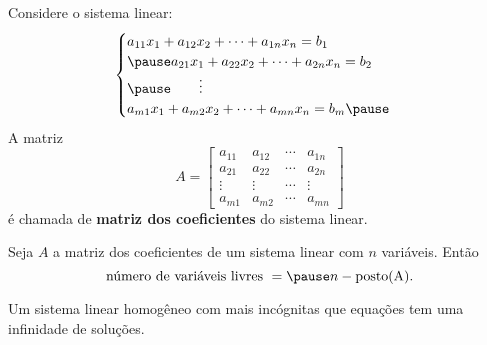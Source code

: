 \documentclass{beamer}
\begin{document}
    \begin{frame}
        Considere o sistema linear:
        \begin{equation*}
            \begin{cases}
                a_{11}x_1 + a_{12}x_2 + \cdots + a_{1n}x_n = b_1\\\pause
                a_{21}x_1 + a_{22}x_2 + \cdots + a_{2n}x_n = b_2\\\pause
                \qquad \vdots\\
                a_{m1}x_1 + a_{m2}x_2 + \cdots + a_{mn}x_n = b_m\pause
            \end{cases}
        \end{equation*}
        A matriz
        \[
        A = \begin{bmatrix}
            a_{11} & a_{12} & \cdots & a_{1n}\\
            a_{21} & a_{22} & \cdots & a_{2n}\\
            \vdots & \vdots & \cdots & \vdots\\
            a_{m1} & a_{m2} & \cdots & a_{mn}
        \end{bmatrix}
        \]
        é chamada de \textbf{matriz dos coeficientes} do sistema linear.
    \end{frame}

    \begin{frame}
        \begin{teorema}
            Seja $A$ a matriz dos coeficientes de um sistema linear \pause com $n$ variáveis. Então\pause
            \[
            \mbox{número de variáveis livres } = \pause n - \p{A}.
            \]
        \end{teorema}
    \end{frame}

    \begin{frame}
        \begin{teorema}
            Um sistema linear homogêneo com mais incógnitas que equações \pause tem uma infinidade de soluções.
        \end{teorema}
    \end{frame}
\end{document}
